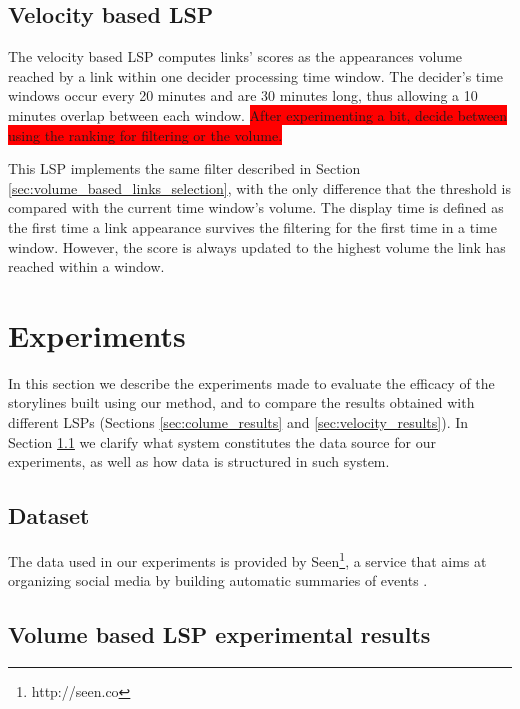 \documentclass{sig-alternate}
\newcommand{\todo}[1]{\colorbox{red}{#1}}
\begin{document}
\subsection{Velocity based LSP}
\label{sec:velocity_based_links_selection}
The velocity based LSP computes links' scores as the appearances volume reached by a link within one decider processing time window. The decider's time windows occur every 20 minutes and are 30 minutes long, thus allowing a 10 minutes overlap between each window. \todo{After experimenting a bit, decide between using the ranking for filtering or the volume.}

This LSP implements the same filter described in Section \ref{sec:volume_based_links_selection}, with the only difference that the threshold is compared with the current time window's volume. The display time is defined as the first time a link appearance survives the filtering for the first time in a time window. However, the score is always updated to the highest volume the link has reached within a window.


\section{Experiments}
\label{sec:experiment}
In this section we describe the experiments made to evaluate the efficacy of the storylines built using our method, and to compare the results obtained with different LSPs (Sections \ref{sec:colume_results} and \ref{sec:velocity_results}). In Section \ref{sec:dataset} we clarify what system constitutes the data source for our experiments, as well as how data is structured in such system.

\subsection{Dataset}
\label{sec:dataset}
The data used in our experiments is provided by Seen\footnote{http://seen.co}, a service that aims at organizing social media by building automatic summaries of events \cite{SeenWired}.

\subsection{Volume based LSP experimental results}
\label{sec:volume_results}
\end{document}
